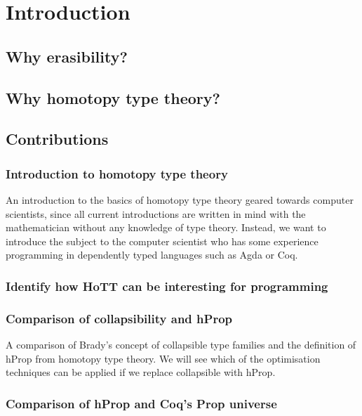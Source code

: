
\section{Introduction}
\label{sec-1}

\subsection{Why erasibility?}
\label{sec-1.1}

\subsection{Why homotopy type theory?}
\label{sec-1.2}

\subsection{Contributions}
\label{sec-1.3}

\subsubsection{Introduction to homotopy type theory}
\label{sec-1.3.1}

An introduction to the basics of homotopy type theory geared towards
computer scientists, since all current introductions are written in
mind with the mathematician without any knowledge of type
theory. Instead, we want to introduce the subject to the computer
scientist who has some experience programming in dependently typed
languages such as Agda or Coq. 

\subsubsection{Identify how HoTT can be interesting for programming}
\label{sec-1.3.2}


\subsubsection{Comparison of collapsibility and hProp}
\label{sec-1.3.3}

A comparison of Brady's concept of collapsible type families and the
definition of hProp from homotopy type theory. We will see which of
the optimisation techniques can be applied if we replace collapsible
with hProp.

\subsubsection{Comparison of hProp and Coq's Prop universe}
\label{sec-1.3.4}

